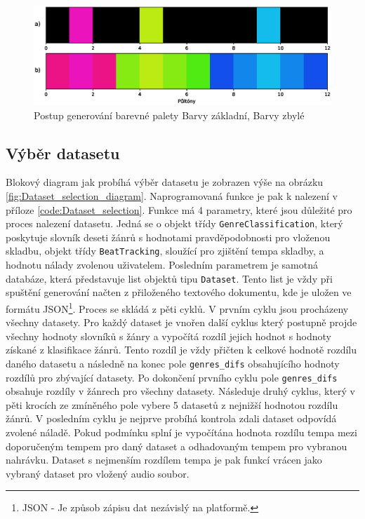 \begin{figure}[H]
    \centering
    \includegraphics[width = 1\linewidth]{obrazky/Color_palete.eps}
    \caption{Postup generování barevné palety  Barvy základní,  Barvy zbylé}
    \label{fig:Color_palete}
\end{figure}

\subsection{Výběr datasetu} \label{sec:Vyber_datasetu}

Blokový diagram jak probíhá výběr datasetu je zobrazen výše na obrázku \ref{fig:Dataset_selection_diagram}. Naprogramovaná funkce je pak k nalezení v příloze \ref{code:Dataset_selection}. Funkce má 4 parametry, které jsou důležité pro proces nalezení datasetu. Jedná se o objekt třídy \texttt{GenreClassification}, který poskytuje slovník deseti žánrů s hodnotami pravděpodobnosti pro vloženou skladbu, objekt třídy \texttt{BeatTracking}, sloužící pro zjištění tempa skladby, a hodnotu nálady zvolenou uživatelem. Posledním parametrem je samotná databáze, která představuje list objektů tipu \texttt{Dataset}. Tento list je vždy při spuštění generování načten z přiloženého textového dokumentu, kde je uložen ve formátu \acs{JSON}\footnote{JSON - Je způsob zápisu dat nezávislý na platformě.\cite{JSON}}. Proces se skládá z pěti cyklů. V prvním cyklu jsou procházeny všechny datasety. Pro každý dataset je vnořen další cyklus který postupně projde všechny hodnoty slovníků s žánry a vypočítá rozdíl jejich hodnot s hodnoty získané z klasifikace žánrů. Tento rozdíl je vždy přičten k celkové hodnotě rozdílu daného datasetu a následně na konec pole \texttt{genres\_difs} obsahujícího hodnoty rozdílů pro zbývající datasety. Po dokončení prvního cyklu pole \texttt{genres\_difs} obsahuje rozdíly v žánrech pro všechny datasety. Následuje druhý cyklus, který v pěti krocích ze zmíněného pole vybere 5 datasetů z nejnižší hodnotou rozdílu žánrů. V posledním cyklu je nejprve probíhá kontrola zdali dataset odpovídá zvolené náladě. Pokud podmínku splní je vypočítána hodnota rozdílu tempa mezi doporučeným tempem pro daný dataset a odhadovaným tempem pro vybranou nahrávku. Dataset s nejmenším rozdílem tempa je pak funkcí vrácen jako vybraný dataset pro vložený audio soubor. 

